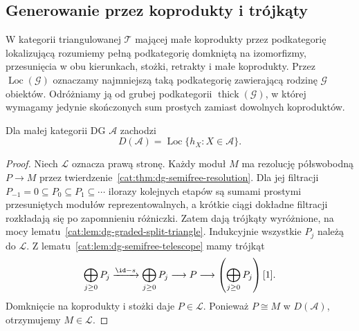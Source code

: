 \subsection{Generowanie przez koprodukty i trójkąty}

\begin{definicja}\label{cat:def:morita-localizing}
W kategorii triangulowanej $\mathcal T$ mającej małe koprodukty przez podkategorię lokalizującą rozumiemy pełną podkategorię domkniętą na izomorfizmy, przesunięcia w obu kierunkach, stożki, retrakty i małe koprodukty. Przez $\operatorname{Loc}(\mathcal G)$ oznaczamy najmniejszą taką podkategorię zawierającą rodzinę $\mathcal G$ obiektów. Odróżniamy ją od grubej podkategorii $\operatorname{thick}(\mathcal G)$, w której wymagamy jedynie skończonych sum prostych zamiast dowolnych koproduktów.
\end{definicja}

\begin{lemat}\label{cat:lem:morita-representable-localizing}
Dla małej kategorii DG $\mathcal A$ zachodzi
\[
 D(\mathcal A)=\operatorname{Loc}\{h_X:X\in\mathcal A\}.
\]
\end{lemat}
\begin{proof}
Niech $\mathcal L$ oznacza prawą stronę. Każdy moduł $M$ ma rezolucję półswobodną $P\to M$ przez twierdzenie~\ref{cat:thm:dg-semifree-resolution}. Dla jej filtracji $P_{-1}=0\subseteq P_0\subseteq P_1\subseteq\cdots$ ilorazy kolejnych etapów są sumami prostymi przesuniętych modułów reprezentowalnych, a krótkie ciągi dokładne filtracji rozkładają się po zapomnieniu różniczki. Zatem dają trójkąty wyróżnione, na mocy lematu~\ref{cat:lem:dg-graded-split-triangle}. Indukcyjnie wszystkie $P_j$ należą do $\mathcal L$. Z lematu~\ref{cat:lem:dg-semifree-telescope} mamy trójkąt
\[
 \bigoplus_{j\geq0}P_j\xrightarrow{\id-s}
 \bigoplus_{j\geq0}P_j\longrightarrow P
 \longrightarrow\left(\bigoplus_{j\geq0}P_j\right)[1].
\]
Domknięcie na koprodukty i stożki daje $P\in\mathcal L$. Ponieważ $P\cong M$ w $D(\mathcal A)$, otrzymujemy $M\in\mathcal L$.
\end{proof}

